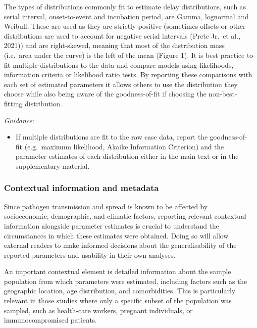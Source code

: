\documentclass[
  10pt,
  letterpaper,
]{article}
\providecommand{\tightlist}{%
  \setlength{\itemsep}{0pt}\setlength{\parskip}{0pt}}\usepackage{longtable,booktabs,array}
\begin{document}
The types of distributions commonly fit to estimate delay distributions,
such as serial interval, onset-to-event and incubation period, are
Gamma, lognormal and Weibull. These are used as they are strictly
positive (sometimes offsets or other distributions are used to account
for negative serial intervals (Prete Jr.~et al., 2021)) and are
right-skewed, meaning that most of the distribution mass (i.e.~area
under the curve) is the left of the mean (Figure 1). It is best practice
to fit multiple distributions to the data and compare models using
likelihoods, information criteria or likelihood ratio tests. By
reporting these comparisons with each set of estimated parameters it
allows others to use the distribution they choose while also being aware
of the goodness-of-fit if choosing the non-best-fitting distribution.

\emph{Guidance}:

\begin{itemize}
\tightlist
\item
  If multiple distributions are fit to the raw case data, report the
  goodness-of-fit (e.g.~maximum likelihood, Akaike Information
  Criterion) and the parameter estimates of each distribution either in
  the main text or in the supplementary material.
\end{itemize}

\subsubsection{Contextual information and
metadata}\label{contextual-information-and-metadata}

Since pathogen transmission and spread is known to be affected by
socioeconomic, demographic, and climatic factors, reporting relevant
contextual information alongside parameter estimates is crucial to
understand the circumstances in which these estimates were obtained.
Doing so will allow external readers to make informed decisions about
the generalisability of the reported parameters and usability in their
own analyses.

An important contextual element is detailed information about the sample
population from which parameters were estimated, including factors such
as the geographic location, age distribution, and comorbidities. This is
particularly relevant in those studies where only a specific subset of
the population was sampled, such as health-care workers, pregnant
individuals, or immunocompromised patients.
\end{document}
